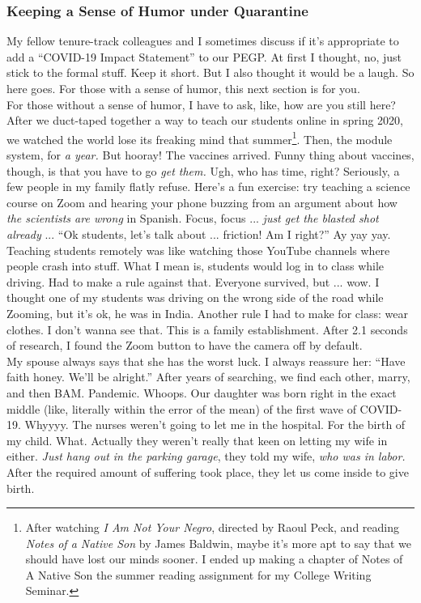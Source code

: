 \documentclass[../../main.tex]{subfiles}
\begin{document}
\subsubsection{Keeping a Sense of Humor under Quarantine}

My fellow tenure-track colleagues and I sometimes discuss if it's appropriate to add a ``COVID-19 Impact Statement'' to our PEGP.  At first I thought, no, just stick to the formal stuff.  Keep it short.  But I also thought it would be a laugh.  So here goes.  For those with a sense of humor, this next section is for you.  
\\
\vspace{0.25cm}
For those without a sense of humor, I have to ask, like, how are you still here?  After we duct-taped together a way to teach our students online in spring 2020, we watched the world lose its freaking mind that summer\footnote{After watching \textit{I Am Not Your Negro}, directed by Raoul Peck, and reading \textit{Notes of a Native Son} by James Baldwin, maybe it's more apt to say that we should have lost our minds sooner. I ended up making a chapter of Notes of A Native Son the summer reading assignment for my College Writing Seminar.}.  Then, the module system, for \textit{a year.}  But hooray!  The vaccines arrived.  Funny thing about vaccines, though, is that you have to go \textit{get them.}  Ugh, who has time, right?  Seriously, a few people in my family flatly refuse.  Here's a fun exercise: try teaching a science course on Zoom and hearing your phone buzzing from an argument about how \textit{the scientists are wrong} in Spanish.  Focus, focus ... \textit{just get the blasted shot already} ... ``Ok students, let's talk about ... friction!  Am I right?''  Ay yay yay.
\\
\vspace{0.25cm}
Teaching students remotely was like watching those YouTube channels where people crash into stuff.  What I mean is, students would log in to class while driving.  Had to make a rule against that.  Everyone survived, but ... wow.  I thought one of my students was driving on the wrong side of the road while Zooming, but it's ok, he was in India.  Another rule I had to make for class: wear clothes.  I don't wanna see that.  This is a family establishment.  After 2.1 seconds of research, I found the Zoom button to have the camera off by default.
\\
\vspace{0.25cm}
My spouse always says that she has the worst luck.  I always reassure her: ``Have faith honey.  We'll be alright.''  After years of searching, we find each other, marry, and then BAM.  Pandemic.  Whoops.  Our daughter was born right in the exact middle (like, literally within the error of the mean) of the first wave of COVID-19.  Whyyyy.  The nurses weren't going to let me in the hospital.  For the birth of my child.  What.  Actually they weren't really that keen on letting my wife in either.  \textit{Just hang out in the parking garage}, they told my wife, \textit{who was in labor.}  After the required amount of suffering took place, they let us come inside to give birth.
\end{document}
